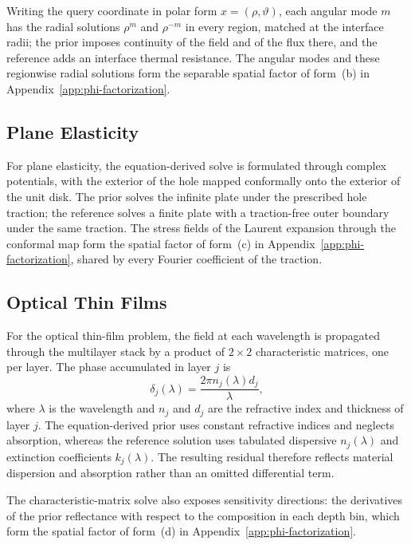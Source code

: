 \documentclass{article}
\begin{document}
Writing the query coordinate in polar form \(x=(\rho,\vartheta)\), each angular mode $m$ has the radial solutions $\rho^{m}$ and $\rho^{-m}$ in every region, matched at the interface radii; the prior imposes continuity of the field and of the flux there, and the reference adds an interface thermal resistance. The angular modes and these regionwise radial solutions form the separable spatial factor of form~(b) in Appendix~\ref{app:phi-factorization}.

\subsection{Plane Elasticity}
\label{app:elasticity-representation}

For plane elasticity, the equation-derived solve is formulated through complex potentials, with the exterior of the hole mapped conformally onto the exterior of the unit disk. The prior solves the infinite plate under the prescribed hole traction; the reference solves a finite plate with a traction-free outer boundary under the same traction. The stress fields of the Laurent expansion through the conformal map form the spatial factor of form~(c) in Appendix~\ref{app:phi-factorization}, shared by every Fourier coefficient of the traction.

\subsection{Optical Thin Films}
\label{app:optical-representation}

For the optical thin-film problem, the field at each wavelength is propagated through
the multilayer stack by a product of $2\times2$ characteristic matrices, one per
layer. The phase accumulated in layer $j$ is
\begin{equation}
\delta_j(\lambda)
=
\frac{2\pi n_j(\lambda)d_j}{\lambda},
\label{eq:app-optical-phase}
\end{equation}
where \(\lambda\) is the wavelength and \(n_j\) and \(d_j\) are the refractive index and thickness of layer \(j\). The equation-derived prior uses constant refractive indices and neglects absorption,
whereas the reference solution uses tabulated dispersive $n_j(\lambda)$ and
extinction coefficients \(k_j(\lambda)\). The resulting residual therefore reflects material dispersion and
absorption rather than an omitted differential term.

The characteristic-matrix solve also exposes sensitivity directions: the derivatives of the prior reflectance with respect to the composition in each depth bin, which form the spatial factor of form~(d) in Appendix~\ref{app:phi-factorization}.
\end{document}
